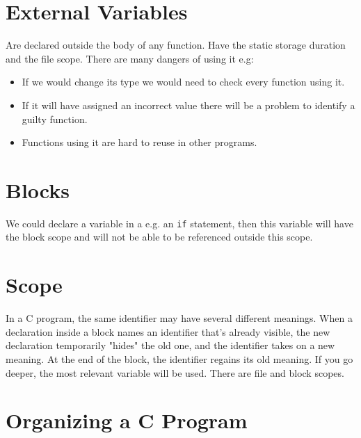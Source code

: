 \documentclass[openany]{book}
\begin{document}
    \section{External Variables}
    Are declared outside the body of any function. Have the static storage duration and the file
    scope. There are many dangers of using it e.g:
    \begin{itemize}
        \item If we would change its type we would need to check every function using it.
        \item If it will have assigned an incorrect value there will be a problem to identify a guilty
        function.
        \item Functions using it are hard to reuse in other programs.
    \end{itemize}
    
    \section{Blocks}
    We could declare a variable in a e.g. an \texttt{if} statement, then this variable will have
    the block scope and will not be able to be referenced outside this scope.
    
    \section{Scope}
    In a C program, the same identifier may have several different meanings. When a declaration inside
    a block names an identifier that's already visible, the new declaration temporarily "hides" the old
    one, and the identifier takes on a new meaning. At the end of the block, the identifier regains its
    old meaning. If you go deeper, the most relevant variable will be used. There are file and block
    scopes.
    
    \section{Organizing a C Program}
\end{document}
